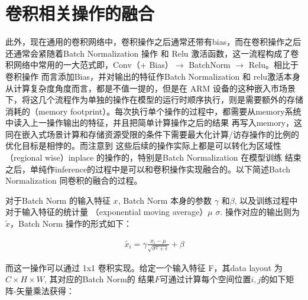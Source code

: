 \section{卷积相关操作的融合}

此外，现在通用的卷积网络中，卷积操作之后通常还带有bias，而在卷积操作之后还通常会紧随着Batch Normalization 操作
和 Relu 激活函数，这一流程构成了卷积网络中常用的一大范式即，Conv（+ Bias）$\to$ BatchNorm $\to$ Relu。相比于卷积操作
而言添加Bias，并对输出的特征作Batch Normalization 和 relu激活本身从计算复杂度角度而言，都是不值一提的，但是在
ARM 设备的这种嵌入市场景下，将这几个流程作为单独的操作在模型的运行时顺序执行，则是需要额外的存储消耗的（memory 
footprint）。每次执行单个操作的过程中，都需要从memory系统中读入上一操作输出的特征，并且把简单计算操作之后的结果
再写入memory，这同在嵌入式场景计算和存储资源受限的条件下需要最大化计算/访存操作的比例的优化目标是相悖的。而注意到
这些后续的操作实际上都是可以转化为区域性（regional wise）inplace 的操作的，特别是Batch Normalization 在模型训练
结束之后，单纯作inference的过程中是可以和卷积操作实现融合的。以下简述Batch Normalization 同卷积的融合的过程。

对于Batch Norm 的输入特征 $x$, Batch Norm 本身的参数 $\gamma$ 和$\beta$, 以及训练过程中对于输入特征的统计量
（exponential moving average）$\mu$ $\sigma$. 操作对应的输出则为 $\tilde{x}$，Batch Norm 操作的形式如下：

\begin{align}
\label{eq:bn}
\tilde{x_i} = \gamma \frac{x_i - \mu}{\sqrt{\sigma^2 + \epsilon}} + \beta
\end{align}

而这一操作可以通过 1x1 卷积实现。给定一个输入特征 F，其data layout 为 $C \times H \times W$, 其对应的Batch Norm的
结果$\hat{F}$可通过计算每个空间位置$i, j$的如下矩阵-矢量乘法获得：

